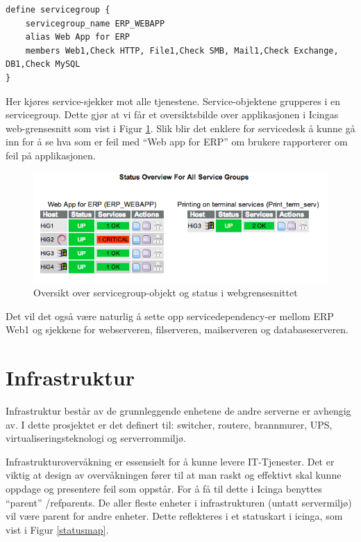 \begin{lstlisting}
define servicegroup {
	servicegroup_name ERP_WEBAPP
	alias Web App for ERP
	members Web1,Check HTTP, File1,Check SMB, Mail1,Check Exchange, DB1,Check MySQL
}
\end{lstlisting}


Her kjøres service-sjekker mot alle tjenestene. Service-objektene grupperes i en servicegroup. 
Dette gjør at vi får et oversiktsbilde over applikasjonen i Icingas web-grensesnitt som vist i Figur \ref{servicegroup_web}. Slik blir det enklere for servicedesk å kunne gå inn for å se hva som er feil med “Web app for ERP” om brukere rapporterer om feil på applikasjonen.

\begin{figure}
    \centering
    \includegraphics[scale=0.6]{img/servicegroup_web}
    \caption{ Oversikt over servicegroup-objekt og status i webgrensesnittet}
    \label{servicegroup_web}
\end{figure}

Det vil det også være naturlig å sette opp servicedependency-er mellom ERP Web1 og sjekkene for webserveren, filserveren, mailserveren og databaseserveren.

\section{Infrastruktur}
Infrastruktur består av de grunnleggende enhetene de andre serverne er avhengig av. I dette prosjektet er det definert til: switcher, routere, brannmurer, UPS, virtualiseringsteknologi og serverrommiljø.

Infrastrukturovervåkning er essensielt for å kunne levere IT-Tjenester. Det er viktig at design av overvåkningen fører til at man raskt og effektivt skal kunne oppdage og presentere feil som oppstår. For å få til dette i Icinga benyttes “parent” /ref{parents}. De aller fleste enheter i infrastrukturen (untatt servermiljø) vil være parent for andre enheter. Dette reflekteres i et statuskart i icinga, som vist i Figur \ref{statusmap}.

